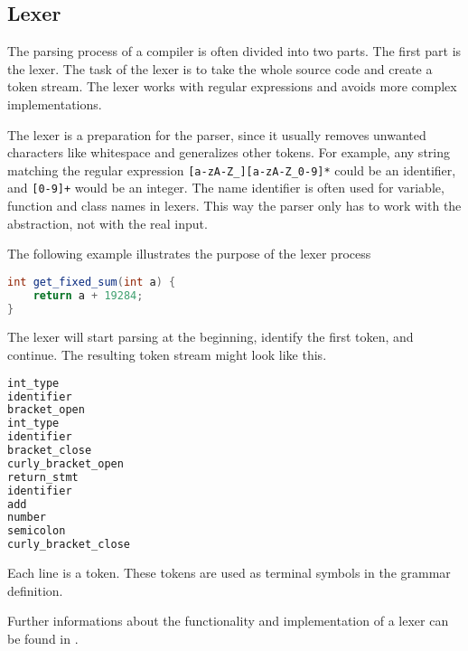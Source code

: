 
\subsection{Lexer}

The parsing process of a compiler is often divided into two parts. The first part is the lexer. 
The task of the lexer is to take the whole source code and create a token stream. 
The lexer works with regular expressions and avoids more complex implementations.

The lexer is a preparation for the parser, since it usually removes unwanted characters like whitespace and generalizes other tokens.
For example, any string matching the regular expression \verb|[a-zA-Z_][a-zA-Z_0-9]*| could be an identifier, and \verb|[0-9]+| would be an integer. 
The name identifier is often used for variable, function and class names in lexers. 
This way the parser only has to work with the abstraction, not with the real input.

The following example illustrates the purpose of the lexer process
\begin{lstlisting}[language=Java, caption="Example input for the lexer"]
int get_fixed_sum(int a) {
    return a + 19284;
}
\end{lstlisting}

The lexer will start parsing at the beginning, identify the first token, and continue. The resulting token stream might look like this.

\begin{lstlisting}[language=Java, caption="Example output of the lexer"]
int_type 
identifier
bracket_open
int_type
identifier
bracket_close
curly_bracket_open
return_stmt
identifier
add
number
semicolon
curly_bracket_close
\end{lstlisting}

Each line is a token. These tokens are used as terminal symbols in the grammar definition.

Further informations about the functionality and implementation of a lexer can be found in \cite[pages 109-189]{AhoLSU2006}.